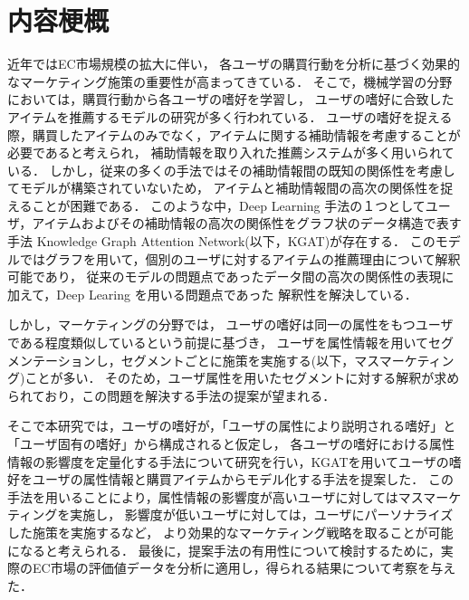 \chapter*{内容梗概}
近年ではEC市場規模の拡大に伴い，
各ユーザの購買行動を分析に基づく効果的なマーケティング施策の重要性が高まってきている．
そこで，機械学習の分野においては，購買行動から各ユーザの嗜好を学習し，
ユーザの嗜好に合致したアイテムを推薦するモデルの研究が多く行われている．
ユーザの嗜好を捉える際，購買したアイテムのみでなく，アイテムに関する補助情報を考慮することが必要であると考えられ，
補助情報を取り入れた推薦システムが多く用いられている．
しかし，従来の多くの手法ではその補助情報間の既知の関係性を考慮してモデルが構築されていないため，
アイテムと補助情報間の高次の関係性を捉えることが困難である．
このような中，Deep Learning 手法の１つとしてユーザ，アイテムおよびその補助情報の高次の関係性をグラフ状のデータ構造で表す手法
Knowledge Graph Attention Network(以下，KGAT)が存在する．
このモデルではグラフを用いて，個別のユーザに対するアイテムの推薦理由について解釈可能であり，
従来のモデルの問題点であったデータ間の高次の関係性の表現に加えて，Deep Learing を用いる問題点であった
解釈性を解決している．

しかし，マーケティングの分野では，
ユーザの嗜好は同一の属性をもつユーザである程度類似しているという前提に基づき，
ユーザを属性情報を用いてセグメンテーションし，セグメントごとに施策を実施する(以下，マスマーケティング)ことが多い．
そのため，ユーザ属性を用いたセグメントに対する解釈が求められており，この問題を解決する手法の提案が望まれる．

そこで本研究では，ユーザの嗜好が，「ユーザの属性により説明される嗜好」と「ユーザ固有の嗜好」から構成されると仮定し，
各ユーザの嗜好における属性情報の影響度を定量化する手法について研究を行い，KGATを用いてユーザの嗜好をユーザの属性情報と購買アイテムからモデル化する手法を提案した．
この手法を用いることにより，属性情報の影響度が高いユーザに対してはマスマーケティングを実施し，
影響度が低いユーザに対しては，ユーザにパーソナライズした施策を実施するなど，
より効果的なマーケティング戦略を取ることが可能になると考えられる．
最後に，提案手法の有用性について検討するために，実際のEC市場の評価値データを分析に適用し，得られる結果について考察を与えた．

\tableofcontents

